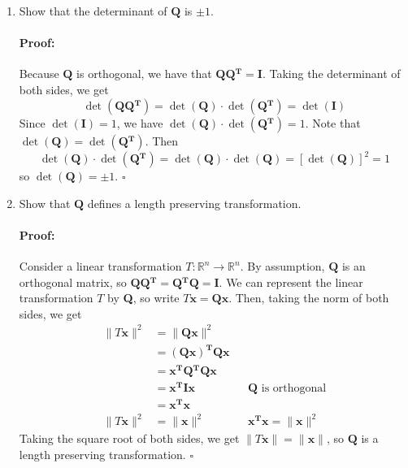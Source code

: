 \documentclass [11pt] {article}
\newcommand{\R}{\mathbb{R}}
\newcommand{\T}{\bf{T}}
\newcommand{\QQ}{\bf{Q}}
\newcommand{\QT}{\bf{Q$^{\bf{T}}$}}
\newcommand{\x}{\bf{x}}
\newenvironment{proof}{\begin{responseframe}\vspace{-10pt}\paragraph{Proof:}}{\hfill$\square$\end{responseframe}}
\renewcommand{\bf}[1]{\textbf{{#1}}}
\begin{document}
\begin{enumerate}
\begin{enumerate}
\begin{enumerate}[itemsep=10pt]
                    \item Show that the determinant of $\QQ$ is $\pm 1$.
                        \begin{proof}
                            Because $\QQ$ is orthogonal, we have that $\QQ \QT = \bf{I}$. Taking 
                            the determinant of both sides, we get
                            \[\det \left( \QQ \QT \right) = \det \left( \QQ \right) \cdot 
                            \det \left( \QT \right) = \det \left( \bf{I} \right)\]
                            Since $\det \left( \bf{I} \right) = 1$, we have
                            $\det \left( \QQ \right) \cdot \det \left( \QT \right) = 1$. Note that
                            $\det \left( \QQ \right) = \det \left( \QT \right)$. Then
                            \[\det \left( \QQ \right) \cdot \det \left( \QT \right) = 
                                \det \left( \QQ \right) \cdot \det \left( \QQ \right) = 
                            \left[ \det \left( \QQ \right) \right]^2 = 1 \]
                            so $\det \left( \QQ \right) = \pm 1$.
                        \end{proof}

                        \newpage
                    \item Show that $\QQ$ defines a length preserving transformation.
                        \begin{proof}
                            Consider a linear transformation $T : \R^n \to \R^n$. By assumption, 
                            $\QQ$ is an orthogonal matrix, so $\QQ \QT = \QT \QQ = \bf{I}$. We can 
                            represent the linear transformation $T$ by \QQ, so write $T \x = \QQ \x$. 
                            Then, taking the norm of both sides, we get
                            \begin{align*}
                                \|T \x\|^2 &= \|\QQ \x\|^2 \\
                                           &= \left( \QQ \x \right)^{\T} \QQ \x \\
                                           &= \x^{\T} \QT  \QQ \x \\ 
                                           &= \x^{\T} \bf{I} \x && \text{$\QQ$ is orthogonal} \\ 
                                           &= \x^{\T} \x \\ 
                                \|T \x\|^2 &= \|\x\|^2 && \x^{\T} \x = \|\x\|^2
                            \end{align*}
                            Taking the square root of both sides, we get $\|T \x\| = \|\x\|$, so $\QQ$
                            is a length preserving transformation.
                        \end{proof}
                \end{enumerate}


\end{enumerate}
\end{enumerate}
\end{document}
